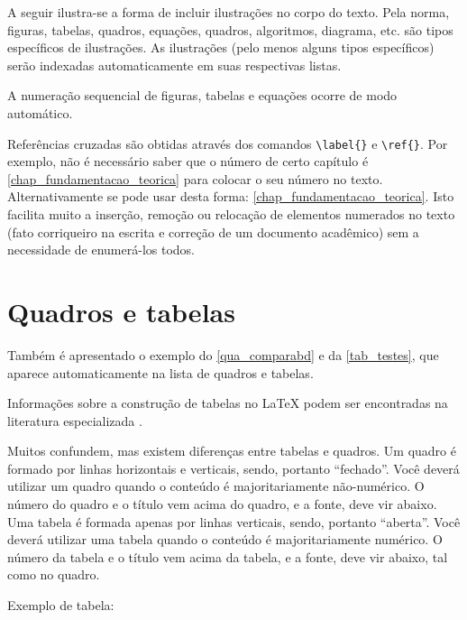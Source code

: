 \begin{apendicesenv}
    A seguir ilustra-se a forma de incluir ilustrações no corpo do texto.
    Pela norma, figuras, tabelas, quadros, equações, quadros, algoritmos, diagrama, etc.
    são tipos específicos de ilustrações.
    As ilustrações (pelo menos alguns tipos específicos) serão indexadas automaticamente em suas respectivas listas.

    A numeração sequencial de figuras, tabelas e equações ocorre de modo automático.

    Referências cruzadas são obtidas através dos comandos \verb|\label{}| e \verb|\ref{}|.
    Por exemplo, não é necessário saber que o número de certo capítulo é \ref{chap_fundamentacao_teorica} para colocar o seu número no texto.
    Alternativamente se pode usar desta forma: \autoref{chap_fundamentacao_teorica}.
    Isto facilita muito a inserção, remoção ou relocação de elementos numerados no texto (fato corriqueiro na escrita e correção de um documento acadêmico) sem a necessidade de enumerá-los todos.

    \newpage

    \section{Quadros e tabelas}
    \label{sec_tabelas}

    Também é apresentado o exemplo do \autoref{qua_comparabd} e da \autoref{tab_testes}, que aparece automaticamente na lista de quadros e tabelas.

    Informações sobre a construção de tabelas no \LaTeX{} podem ser encontradas na literatura especializada \cite{Lamport1986,Buerger1989,Kopka2003,Mittelbach2004}.

    

    Muitos confundem, mas existem diferenças entre  tabelas e  quadros.
    Um quadro é formado por linhas horizontais e verticais, sendo, portanto ``fechado''.
    Você deverá utilizar um quadro quando o conteúdo é majoritariamente não-numérico.
    O número do quadro e o título vem acima do quadro, e a fonte, deve vir abaixo.
    Uma tabela é formada apenas por linhas verticais, sendo, portanto ``aberta''.
    Você deverá utilizar uma tabela quando o conteúdo é majoritariamente numérico.
    O número da tabela e o título vem acima da tabela, e a fonte, deve vir abaixo, tal como no quadro.

    Exemplo de tabela:


\end{apendicesenv}
